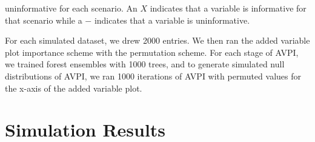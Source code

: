 \documentclass[12pt,twoside]{reedthesis}
\theoremstyle{definition}
\theoremstyle{definition}
\theoremstyle{definition}
\theoremstyle{remark}
\begin{document}
uninformative for each scenario. An \(X\) indicates that a variable is
informative for that scenario while a \(-\) indicates that a variable is
uninformative. \par
\begin{table}

\caption{\label{tab:unnamed-chunk-4}Informative and Uninformative Variables For Each Scenario}
\centering
{}
\end{table}
For each simulated dataset, we drew 2000 entries. We then ran the added
variable plot importance scheme with the permutation scheme. For each
stage of AVPI, we trained forest ensembles with 1000 trees, and to
generate simulated null distributions of AVPI, we ran 1000 iterations of
AVPI with permuted values for the x-axis of the added variable plot.
\par

\section{Simulation Results}\label{simulation-results}
\end{document}
